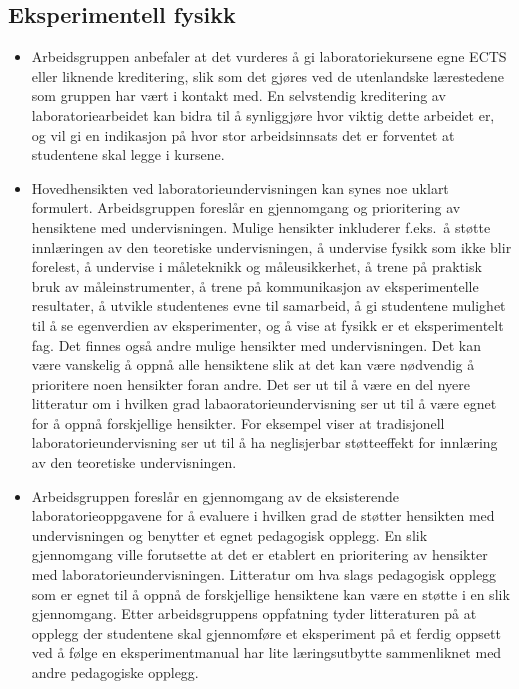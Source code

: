 \documentclass{article}
\begin{document}
\subsection{Eksperimentell fysikk}
\begin{itemize}
  \item Arbeidsgruppen anbefaler at det vurderes å gi laboratoriekursene egne ECTS eller liknende kreditering, slik som det gjøres ved de utenlandske lærestedene som gruppen har vært i kontakt med. En selvstendig kreditering av laboratoriearbeidet kan bidra til å synliggjøre hvor viktig dette arbeidet er, og vil gi en indikasjon på hvor stor arbeidsinnsats det er forventet at studentene skal legge i kursene.

  \item Hovedhensikten ved laboratorieundervisningen kan synes noe uklart formulert. Arbeidsgruppen foreslår en gjennomgang og prioritering av hensiktene med undervisningen. Mulige hensikter inkluderer f.eks.~å støtte innlæringen av den teoretiske undervisningen, å undervise fysikk som ikke blir forelest, å undervise i måleteknikk og måleusikkerhet, å trene på praktisk bruk av måleinstrumenter, å trene på kommunikasjon av eksperimentelle resultater, å utvikle studentenes evne til samarbeid, å gi studentene mulighet til å se egenverdien av eksperimenter, og å vise at fysikk er et eksperimentelt fag. Det finnes også andre mulige hensikter med undervisningen. Det kan være vanskelig å oppnå alle hensiktene slik at det kan være nødvendig å prioritere noen hensikter foran andre. Det ser ut til å være en del nyere litteratur om i hvilken grad labaoratorieundervisning ser ut til å være egnet for å oppnå forskjellige hensikter. For eksempel viser \citet{Holmes} at tradisjonell laboratorieundervisning ser ut til å ha neglisjerbar støtteeffekt for innlæring av den teoretiske undervisningen.

  \item Arbeidsgruppen foreslår en gjennomgang av de eksisterende laboratorieoppgavene for å evaluere i hvilken grad de støtter hensikten med undervisningen og benytter et egnet pedagogisk opplegg. En slik gjennomgang ville forutsette at det er etablert en prioritering av hensikter med laboratorieundervisningen. Litteratur om hva slags pedagogisk opplegg som er egnet til å oppnå de forskjellige hensiktene kan være en støtte i en slik gjennomgang. Etter arbeidsgruppens oppfatning tyder litteraturen på at opplegg der studentene skal gjennomføre et eksperiment på et ferdig oppsett ved å følge en eksperimentmanual har lite læringsutbytte sammenliknet med andre pedagogiske opplegg.


\end{itemize}
\end{document}
